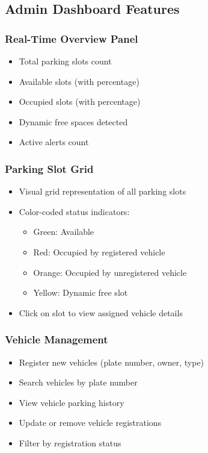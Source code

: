 \documentclass[12pt,a4paper]{report}
\begin{document}
\subsection{Admin Dashboard Features}

\subsubsection{Real-Time Overview Panel}
\begin{itemize}
    \item Total parking slots count
    \item Available slots (with percentage)
    \item Occupied slots (with percentage)
    \item Dynamic free spaces detected
    \item Active alerts count
\end{itemize}

\subsubsection{Parking Slot Grid}
\begin{itemize}
    \item Visual grid representation of all parking slots
    \item Color-coded status indicators:
    \begin{itemize}
        \item Green: Available
        \item Red: Occupied by registered vehicle
        \item Orange: Occupied by unregistered vehicle
        \item Yellow: Dynamic free slot
    \end{itemize}
    \item Click on slot to view assigned vehicle details
\end{itemize}

\subsubsection{Vehicle Management}
\begin{itemize}
    \item Register new vehicles (plate number, owner, type)
    \item Search vehicles by plate number
    \item View vehicle parking history
    \item Update or remove vehicle registrations
    \item Filter by registration status
\end{itemize}
\end{document}
